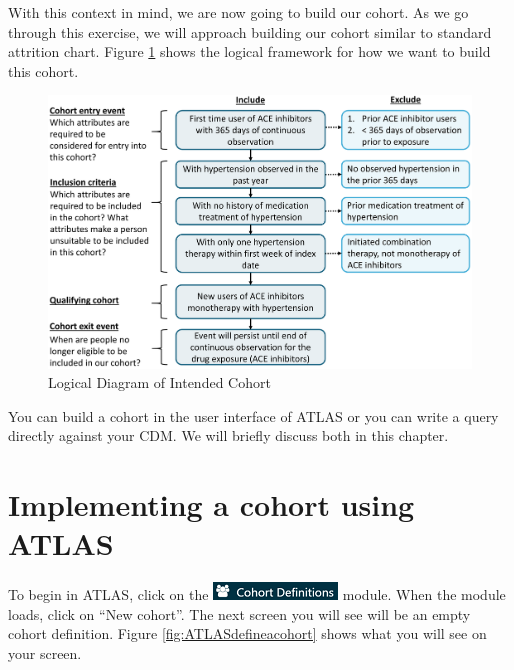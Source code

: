 \documentclass[11pt]{book}
\theoremstyle{definition}
\theoremstyle{definition}
\theoremstyle{definition}
\theoremstyle{remark}
\begin{document}
With this context in mind, we are now going to build our cohort. As we go through this exercise, we will approach building our cohort similar to standard attrition chart. Figure \ref{fig:CohortPractice} shows the logical framework for how we want to build this cohort.

\begin{figure}

{\centering \includegraphics[width=1\linewidth]{images/Cohorts/CohortPractice} 

}

\caption{Logical Diagram of Intended Cohort}\label{fig:CohortPractice}
\end{figure}

You can build a cohort in the user interface of ATLAS or you can write a query directly against your CDM. We will briefly discuss both in this chapter.

\hypertarget{implementing-a-cohort-using-atlas}{%
\section{Implementing a cohort using ATLAS}\label{implementing-a-cohort-using-atlas}}

To begin in ATLAS, click on the \includegraphics{images/Cohorts/cohortdefinition.png} module. When the module loads, click on ``New cohort''. The next screen you will see will be an empty cohort definition. Figure \ref{fig:ATLASdefineacohort} shows what you will see on your screen.
\end{document}
